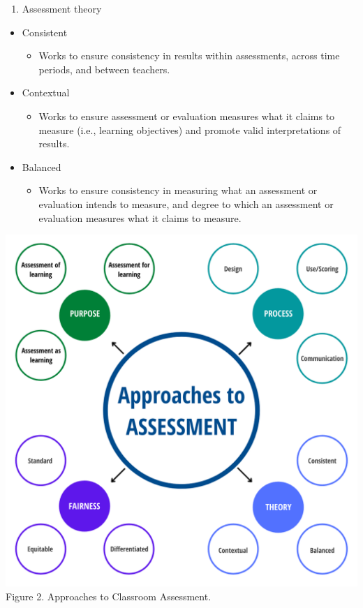 \documentclass[
]{book}
\providecommand{\tightlist}{%
  \setlength{\itemsep}{0pt}\setlength{\parskip}{0pt}}
\begin{document}
\begin{enumerate}
\def\labelenumi{\arabic{enumi}.}
\setcounter{enumi}{3}
\tightlist
\item
  Assessment theory\\
\end{enumerate}

\begin{itemize}
\tightlist
\item
  Consistent

  \begin{itemize}
  \tightlist
  \item
    Works to ensure consistency in results within assessments, across time periods, and between teachers.\\
  \end{itemize}
\item
  Contextual

  \begin{itemize}
  \tightlist
  \item
    Works to ensure assessment or evaluation measures what it claims to measure (i.e., learning objectives) and promote valid interpretations of results.\\
  \end{itemize}
\item
  Balanced

  \begin{itemize}
  \tightlist
  \item
    Works to ensure consistency in measuring what an assessment or evaluation intends to measure, and degree to which an assessment or evaluation measures what it claims to measure.
  \end{itemize}
\end{itemize}

\includegraphics{images/approaches-to-assessment.png}
Figure 2. Approaches to Classroom Assessment. \citep[p.~10]{delucaExploringAssessmentCultures2021}
\end{document}
